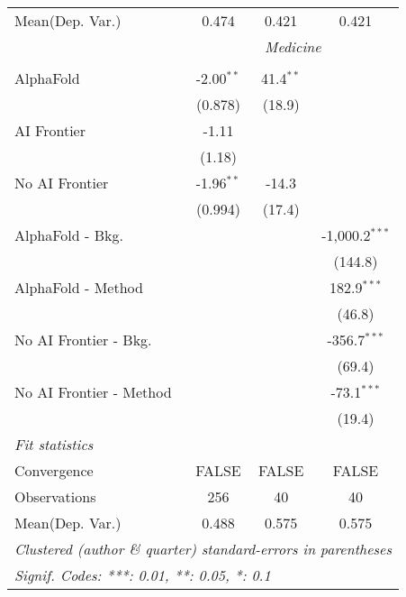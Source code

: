 \begin{tabular}{lccc}
Mean(Dep. Var.) & 0.474 & 0.421 & 0.421 \\
 & \multicolumn{3}{c}{\textit{Medicine}} \\ \\
   AlphaFold               & -2.00$^{**}$ & 41.4$^{**}$ &   \\   
                           & (0.878)      & (18.9)      &   \\   
   AI Frontier             & -1.11        &             &   \\   
                           & (1.18)       &             &   \\   
   No AI Frontier          & -1.96$^{**}$ & -14.3       &   \\   
                           & (0.994)      & (17.4)      &   \\   
   AlphaFold - Bkg.        &              &             & -1,000.2$^{***}$\\   
                           &              &             & (144.8)\\   
   AlphaFold - Method      &              &             & 182.9$^{***}$\\   
                           &              &             & (46.8)\\   
   No AI Frontier - Bkg.   &              &             & -356.7$^{***}$\\   
                           &              &             & (69.4)\\   
   No AI Frontier - Method &              &             & -73.1$^{***}$\\   
                           &              &             & (19.4)\\   
   \midrule
   \emph{Fit statistics}\\
   Convergence             &FALSE         & FALSE       & FALSE\\  
   Observations            & 256          & 40          & 40\\  
Mean(Dep. Var.) & 0.488 & 0.575 & 0.575 \\
   \midrule \midrule
   \multicolumn{4}{l}{\emph{Clustered (author \& quarter) standard-errors in parentheses}}\\
   \multicolumn{4}{l}{\emph{Signif. Codes: ***: 0.01, **: 0.05, *: 0.1}}\\
\end{tabular}
\par\endgroup
